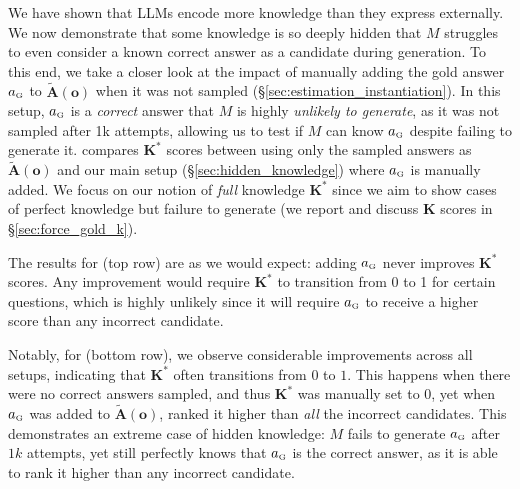 We have shown that LLMs encode more knowledge than they express externally. We now demonstrate that some knowledge is so deeply hidden that $M$ struggles to even consider a known correct answer as a candidate during generation.
To this end, we take a closer look at the impact of manually adding the gold answer $a_{\text{\tiny G}}$ to $\mathbf{\tilde{A}(o)}$ when it was not sampled (§\ref{sec:estimation_instantiation}). 
In this setup, $a_{\text{\tiny G}}$ is a \textit{correct} answer that $M$ is highly \textit{unlikely to generate}, as it was not sampled after 1k attempts, allowing us to test if $M$ can know $a_{\text{\tiny G}}$ despite failing to generate it.
 compares $\mathbf{K^\ast}$ scores between using only the sampled answers as $\mathbf{\tilde{A}(o)}$ and our main setup (\S \ref{sec:hidden_knowledge}) where $a_{\text{\tiny G}}$ is manually added.
We focus on our notion of \textit{full} knowledge $\mathbf{K^\ast}$ since we aim to show cases of perfect knowledge but failure to generate 
(we report and discuss $\mathbf{K}$ scores in \S \ref{sec:force_gold_k}). 

The results for \baselineA (top row) are as we would expect: adding $a_{\text{\tiny G}}$ never improves $\mathbf{K^\ast}$ scores. Any improvement would require $\mathbf{K^\ast}$ to transition from 0 to 1 for certain questions, which is highly unlikely since it will require $a_{\text{\tiny G}}$ to receive a higher score than any incorrect candidate.



Notably, for \baselineD (bottom row), we observe considerable improvements across all setups, indicating that $\mathbf{K^\ast}$ often transitions from $0$ to $1$. 
This happens when there were no correct answers sampled, and thus $\mathbf{K^\ast}$ was manually set to $0$, yet when $a_{\text{\tiny G}}$ was added to $\mathbf{\tilde{A}(o)}$, \baselineD ranked it higher than \textit{all} the incorrect candidates. This demonstrates an extreme case of hidden knowledge: $M$ fails to generate $a_{\text{\tiny G}}$ after $1k$ attempts,
yet still perfectly knows that $a_{\text{\tiny G}}$ is the correct answer, as it is able to rank it higher than any incorrect candidate.

